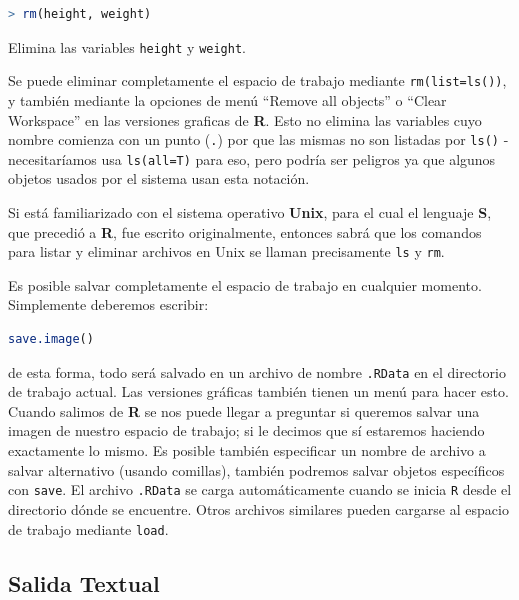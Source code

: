 \documentclass[spanish]{extbook}
\numberwithin{equation}{section}
\numberwithin{figure}{section}
\begin{document}
\begin{lstlisting}[language=R]
> rm(height, weight)
\end{lstlisting}

Elimina las variables \texttt{height} y \texttt{weight}.

Se puede eliminar completamente el espacio de trabajo mediante
\texttt{rm(list=ls())}, y también mediante la opciones de menú “Remove all
objects” o “Clear Workspace” en las versiones graficas de \textbf{R}. Esto no
elimina las variables cuyo nombre comienza con un punto (\texttt{.}) por que
las mismas no son listadas por \texttt{ls()} - necesitaríamos usa
\texttt{ls(all=T)} para eso,  pero podría ser peligros ya que algunos objetos
usados por el sistema usan esta notación.

Si está familiarizado con el sistema operativo \textbf{Unix}, para el cual el
lenguaje \textbf{S}, que precedió a \textbf{R}, fue escrito originalmente,
entonces sabrá que los comandos para listar y eliminar archivos en Unix se
llaman precisamente \texttt{ls} y \texttt{rm}.

Es posible salvar completamente el espacio de trabajo en cualquier momento.
Simplemente deberemos escribir:

\begin{lstlisting}[language=R]
save.image()
\end{lstlisting}

de esta forma, todo será salvado en un archivo de nombre \texttt{.RData} en el
directorio de trabajo actual. Las versiones gráficas también tienen un menú
para hacer esto. Cuando salimos de \textbf{R} se nos puede llegar a preguntar
si queremos salvar una imagen de nuestro espacio de trabajo; si le decimos que
sí estaremos haciendo exactamente lo mismo. Es posible también especificar un
nombre de archivo a salvar alternativo (usando comillas), también podremos
salvar objetos específicos con \texttt{save}. El archivo \texttt{.RData} se
carga automáticamente cuando se inicia \texttt{R} desde el directorio dónde se
encuentre. Otros archivos similares pueden cargarse al espacio de trabajo
mediante \texttt{load}.

\subsection{Salida Textual}
\end{document}
